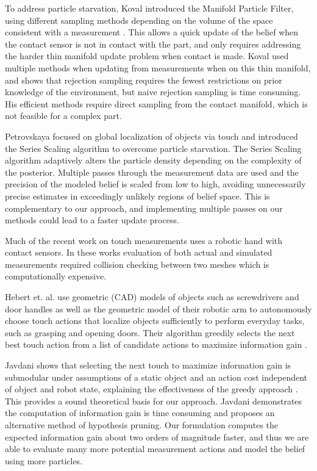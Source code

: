 \documentclass[../thesis.tex]{subfiles}
\begin{document}
To address particle starvation, Koval introduced the Manifold Particle Filter, using different sampling methods depending on the volume of the space consistent with a measurement \cite{Koval2011, Koval2013}. 
This allows a quick update of the belief when the contact sensor is not in contact with the part, and only requires addressing the harder thin manifold update problem when contact is made. 
Koval used multiple methods when updating from measurements when on this thin manifold, and shows that rejection sampling requires the fewest restrictions on prior knowledge of the environment, but naive rejection sampling is time consuming.
His efficient methods require direct sampling from the contact manifold, which is not feasible for a complex part.

Petrovskaya focused on global localization of objects via touch \cite{Petrovskaya2011} and introduced the Series Scaling algorithm to overcome particle starvation. 
The Series Scaling algorithm adaptively alters the particle density depending on the complexity of the posterior. 
Multiple passes through the measurement data are used and the precision of the modeled belief is scaled from low to high, avoiding unnecessarily precise estimates in exceedingly unlikely regions of belief space. 
This is complementary to our approach, and implementing multiple passes on our methods could lead to a faster update process.

Much of the recent work on touch measurements uses a robotic hand with contact sensors. In these works evaluation of both actual and simulated measurements required collision checking between two meshes which is computationally expensive. 


Hebert et. al. use geometric (CAD) models of objects such as screwdrivers and door handles as well as the geometric model of their robotic arm to autonomously choose touch actions that localize objects sufficiently to perform everyday tasks, such as grasping and opening doors. 
Their algorithm greedily selects the next best touch action from a list of candidate actions to maximize information gain \cite{Hebert2013}.


Javdani shows that selecting the next touch to maximize information gain is submodular under assumptions of a static object and an action cost independent of object and robot state, explaining the effectiveness of the greedy approach \cite{Javdani2013}. 
This provides a sound theoretical basis for our approach.
Javdani demonstrates the computation of information gain is time consuming and proposes an alternative method of hypothesis pruning. 
Our formulation computes the expected information gain about two orders of magnitude faster, and thus we are able to evaluate many more potential measurement actions and model the belief using more particles.
\end{document}
